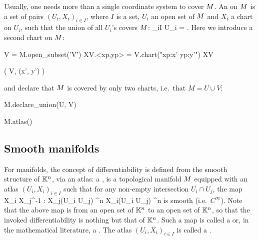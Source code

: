 Usually, one needs more than a single coordinate system to cover $M$.
An  on $M$ is a set of pairs
$(U_i,X_i)_{i\in I}$, where $I$ is a set, $U_i$ an open set of $M$ and $X_i$ a chart on $U_i$,
such that the union of all $U_i$'s covers $M$:
\be
    \bigcup_{i\in I} U_i = \M.
\ee
Here we introduce a second chart on $M$:
\begin{NBin}
V = M.open_subset('V')
XV.<xp,yp> = V.chart("xp:x' yp:y'")
XV
\end{NBin}
\begin{NBoutM}
\left( V, (x', y') \right)
\end{NBoutM}
and declare that $M$ is covered by only two charts, i.e.\ that $M=U\cup V$:
\begin{NBin}
M.declare_union(U, V)
\end{NBin}
\begin{NBin}
M.atlas()
\end{NBin}
\begin{NBoutM}
\end{NBoutM}

\subsection{Smooth manifolds}

For manifolds, the concept of differentiability is
defined from the smooth structure of $\mathbb{K}^n$, via an atlas:
a ,
is a topological manifold $M$ equipped with an atlas
$(U_i,X_i)_{i\in I}$ such that for any non-empty intersection
$U_i \cap U_j$, the map
\be \label{e:bas:transition_map}
    X_i \circ X_j^{-1} : X_j(U_i \cap U_j)
    \subset \K^n \longrightarrow X_i(U_i \cap U_j)
    \subset \K^n
\ee
is smooth (i.e.~$C^\infty$).
Note that the above map is from an open set of $\mathbb{K}^n$ to an open set of $\mathbb{K}^n$, so that the invoked differentiability is nothing but that of $\mathbb{K}^n$.
Such a map is called a  or, in the mathematical literature, a
.
The atlas $(U_i,X_i)_{i\in I}$ is called a
.

